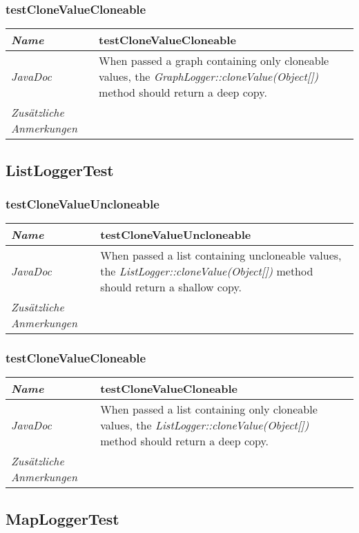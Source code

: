 \documentclass[a4paper]{report}
\begin{document}
\subsubsection{testCloneValueCloneable}
\begin{tabular}{p{2.3cm}  p{11.5cm}}
  \hline
 \textit{Name} & testCloneValueCloneable\\
  \hline
 \textit{JavaDoc} & When passed a graph containing only cloneable values, the \emph{GraphLogger::cloneValue(Object[])} method should return a deep copy.\\
  \hline
 \textit{Zusätzliche Anmerkungen} & \\
  \hline
\end{tabular}

\subsection{ListLoggerTest}

\subsubsection{testCloneValueUncloneable}
\begin{tabular}{p{2.3cm}  p{11.5cm}}
  \hline
 \textit{Name} & testCloneValueUncloneable\\
  \hline
 \textit{JavaDoc} & When passed a list containing uncloneable values, the \emph{ListLogger::cloneValue(Object[])} method should return a shallow copy.\\
  \hline
 \textit{Zusätzliche Anmerkungen} & \\
  \hline
\end{tabular}

\subsubsection{testCloneValueCloneable}
\begin{tabular}{p{2.3cm}  p{11.5cm}}
  \hline
 \textit{Name} & testCloneValueCloneable\\
  \hline
 \textit{JavaDoc} & When passed a list containing only cloneable values, the \emph{ListLogger::cloneValue(Object[])} method should return a deep copy.\\
  \hline
 \textit{Zusätzliche Anmerkungen} & \\
  \hline
\end{tabular}

\subsection{MapLoggerTest}
\end{document}
